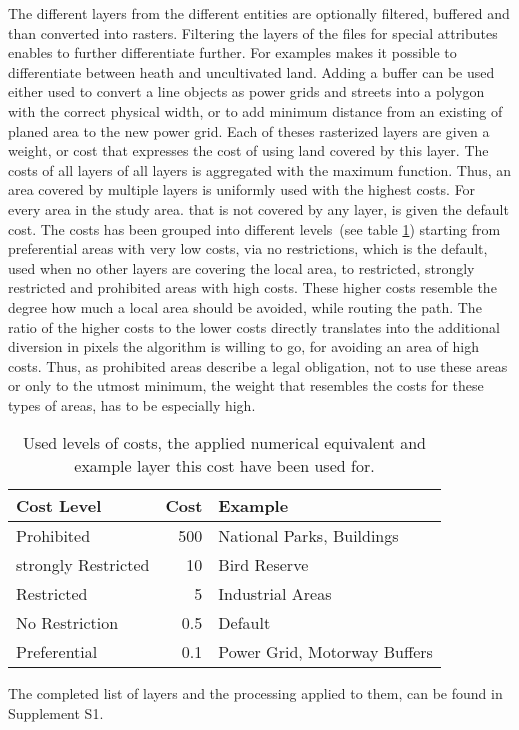 \documentclass[acmtog]{acmart}
\begin{document}
	The different layers from the different entities are optionally filtered, buffered and than converted into rasters. Filtering the layers of the files for special attributes enables to further differentiate further. For examples makes it possible to differentiate between heath and uncultivated land.
	 Adding a buffer can be used either used to convert a line objects as power grids and streets into a polygon with the correct physical width, or to add minimum distance from an existing of planed area to the new power grid.
 	Each of theses rasterized layers are given a weight, or cost that expresses the cost of using land covered by this layer.
 	The costs of all layers of all layers is aggregated with the maximum function. Thus, an area covered by multiple layers is uniformly used with the highest costs. For every area in the study area. that is not covered by any layer, is given the default cost.
	The costs has been grouped into different levels~(see table \ref{table:1}) starting from preferential areas with very low costs, via no restrictions, which is the default, used when no other layers are covering the local area, to restricted, strongly restricted and prohibited areas with high costs. These higher costs resemble the degree how much a local area should be avoided, while routing the path. The ratio of the higher costs to the lower costs directly translates into the additional diversion in pixels the algorithm is willing to go, for avoiding an area of high costs.
	Thus, as prohibited areas describe a legal obligation, not to use these areas or only to the utmost minimum, the weight that resembles the costs for these types of areas, has to be especially high.
	
	\begin{table}[h!]
		\caption{Used levels of costs, the applied numerical equivalent and example layer this cost have been used for.}
		\label{table:1}
		\centering
		\begin{tabular}{ l  r  l }
			Cost Level & Cost &  Example\\
			\hline
			Prohibited & 500					& National Parks, Buildings \\
			strongly Restricted & 10 	& Bird Reserve \\
			Restricted & 5	& Industrial Areas \\
			No Restriction & 0.5					& Default\\
			Preferential & 0.1					& Power Grid, Motorway Buffers\\
		\end{tabular}
	\end{table}
	The completed list of layers and the processing applied to them, can be found in Supplement S1. 
\end{document}
